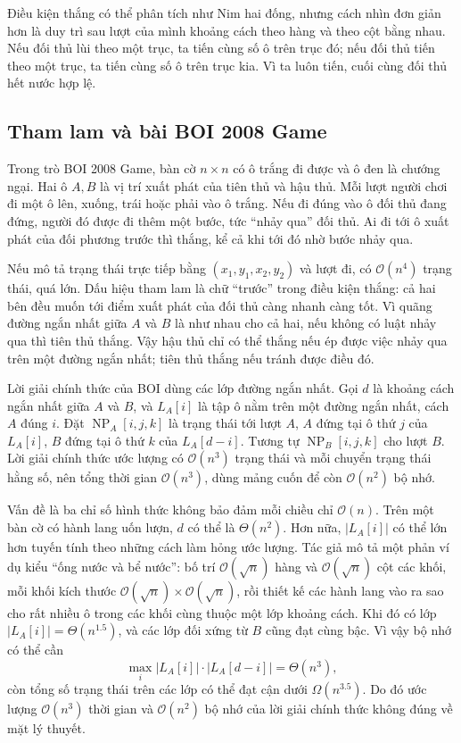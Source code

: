\documentclass[11pt]{article}
\newcommand{\Oh}{\mathcal{O}}
\newcommand{\NP}{\operatorname{NP}}
\begin{document}
Điều kiện thắng có thể phân tích như Nim hai đống, nhưng cách nhìn đơn giản
hơn là duy trì sau lượt của mình khoảng cách theo hàng và theo cột bằng nhau.
Nếu đối thủ lùi theo một trục, ta tiến cùng số ô trên trục đó; nếu đối thủ
tiến theo một trục, ta tiến cùng số ô trên trục kia. Vì ta luôn tiến, cuối
cùng đối thủ hết nước hợp lệ.

\subsection{Tham lam và bài BOI 2008 Game}

Trong trò BOI 2008 Game, bàn cờ \(n\times n\) có ô trắng đi được và ô đen là
chướng ngại. Hai ô \(A,B\) là vị trí xuất phát của tiên thủ và hậu thủ. Mỗi
lượt người chơi đi một ô lên, xuống, trái hoặc phải vào ô trắng. Nếu đi đúng
vào ô đối thủ đang đứng, người đó được đi thêm một bước, tức ``nhảy qua'' đối
thủ. Ai đi tới ô xuất phát của đối phương trước thì thắng, kể cả khi tới đó
nhờ bước nhảy qua.

Nếu mô tả trạng thái trực tiếp bằng \((x_1,y_1,x_2,y_2)\) và lượt đi, có
\(\Oh(n^4)\) trạng thái, quá lớn. Dấu hiệu tham lam là chữ ``trước'' trong
điều kiện thắng: cả hai bên đều muốn tới điểm xuất phát của đối thủ càng nhanh
càng tốt. Vì quãng đường ngắn nhất giữa \(A\) và \(B\) là như nhau cho cả hai,
nếu không có luật nhảy qua thì tiên thủ thắng. Vậy hậu thủ chỉ có thể thắng
nếu ép được việc nhảy qua trên một đường ngắn nhất; tiên thủ thắng nếu tránh
được điều đó.

Lời giải chính thức của BOI dùng các lớp đường ngắn nhất. Gọi \(d\) là khoảng
cách ngắn nhất giữa \(A\) và \(B\), và \(L_A[i]\) là tập ô nằm trên một đường
ngắn nhất, cách \(A\) đúng \(i\). Đặt \(\NP_A[i,j,k]\) là trạng thái tới lượt
\(A\), \(A\) đứng tại ô thứ \(j\) của \(L_A[i]\), \(B\) đứng tại ô thứ \(k\)
của \(L_A[d-i]\). Tương tự \(\NP_B[i,j,k]\) cho lượt \(B\). Lời giải chính
thức ước lượng có \(\Oh(n^3)\) trạng thái và mỗi chuyển trạng thái hằng số,
nên tổng thời gian \(\Oh(n^3)\), dùng mảng cuốn để còn \(\Oh(n^2)\) bộ nhớ.

Vấn đề là ba chỉ số hình thức không bảo đảm mỗi chiều chỉ \(\Oh(n)\). Trên một
bàn cờ có hành lang uốn lượn, \(d\) có thể là \(\Theta(n^2)\). Hơn nữa,
\(|L_A[i]|\) có thể lớn hơn tuyến tính theo những cách làm hỏng ước lượng. Tác
giả mô tả một phản ví dụ kiểu ``ống nước và bể nước'': bố trí
\(\Oh(\sqrt n)\) hàng và \(\Oh(\sqrt n)\) cột các khối, mỗi khối kích thước
\(\Oh(\sqrt n)\times\Oh(\sqrt n)\), rồi thiết kế các hành lang vào ra sao cho
rất nhiều ô trong các khối cùng thuộc một lớp khoảng cách. Khi đó có lớp
\(|L_A[i]|=\Theta(n^{1.5})\), và các lớp đối xứng từ \(B\) cũng đạt cùng bậc.
Vì vậy bộ nhớ có thể cần
\[
  \max_i |L_A[i]|\cdot |L_A[d-i]|=\Theta(n^3),
\]
còn tổng số trạng thái trên các lớp có thể đạt cận dưới \(\Omega(n^{3.5})\).
Do đó ước lượng \(\Oh(n^3)\) thời gian và \(\Oh(n^2)\) bộ nhớ của lời giải
chính thức không đúng về mặt lý thuyết.
\end{document}
